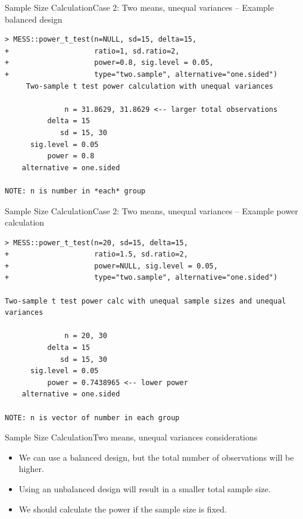 \begin{frame}[fragile]{Sample Size Calculation}{Case 2: Two means, unequal variances -- Example balanced design}

{\small
\begin{verbatim}
> MESS::power_t_test(n=NULL, sd=15, delta=15, 
+                    ratio=1, sd.ratio=2,
+                    power=0.8, sig.level = 0.05,
+                    type="two.sample", alternative="one.sided")
     Two-sample t test power calculation with unequal variances 

              n = 31.8629, 31.8629 <-- larger total observations
          delta = 15
             sd = 15, 30
      sig.level = 0.05
          power = 0.8
    alternative = one.sided

NOTE: n is number in *each* group
\end{verbatim}}
\end{frame}

\begin{frame}[fragile]{Sample Size Calculation}{Case 2: Two means, unequal variances -- Example power calculation}

{\small
\begin{verbatim}
> MESS::power_t_test(n=20, sd=15, delta=15, 
+                    ratio=1.5, sd.ratio=2,
+                    power=NULL, sig.level = 0.05,
+                    type="two.sample", alternative="one.sided")

Two-sample t test power calc with unequal sample sizes and unequal variances 

              n = 20, 30
          delta = 15
             sd = 15, 30
      sig.level = 0.05
          power = 0.7438965 <-- lower power
    alternative = one.sided

NOTE: n is vector of number in each group
\end{verbatim}}
\end{frame}


\begin{frame}{Sample Size Calculation}{Two means, unequal variances considerations}

  \begin{itemize}
  \item We can use a balanced design, but the total number of observations will be higher.
  \item Using an unbalanced design will result in a smaller total sample size.
  \item We should calculate the power if the sample size is fixed.
  \end{itemize}

\end{frame}


